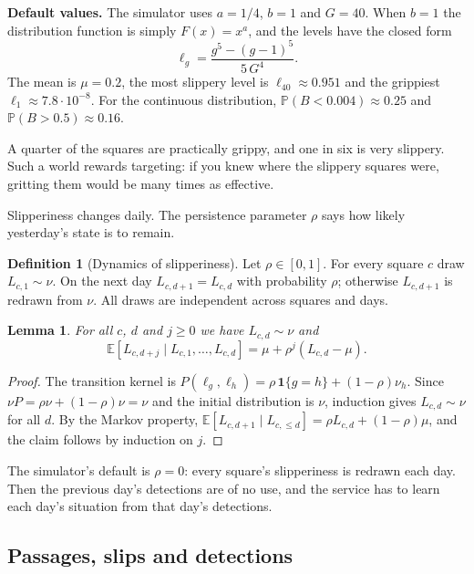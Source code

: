 \documentclass[11pt,a4paper]{article}
\theoremstyle{plain}
\newtheorem{lemma}{Lemma}
\theoremstyle{definition}
\newtheorem{maaritelma}{Definition}
\theoremstyle{remark}
\newcommand{\E}{\mathbb{E}}
\renewcommand{\P}{\mathbb{P}}
\newcommand{\1}{\mathbf{1}}
\begin{document}
\textbf{Default values.} The simulator uses $a = 1/4$, $b = 1$ and $G = 40$.
When $b = 1$ the distribution function is simply $F(x) = x^{a}$, and the levels
have the closed form
\[
  \ell_g = \frac{g^5 - (g-1)^5}{5\, G^4}.
\]
The mean is $\mu = 0.2$, the most slippery level is $\ell_{40} \approx 0.951$ and
the grippiest $\ell_1 \approx 7.8 \cdot 10^{-8}$. For the continuous distribution,
$\P(B < 0.004) \approx 0.25$ and $\P(B > 0.5) \approx 0.16$.

\begin{intuitio}
A quarter of the squares are practically grippy, and one in six is very
slippery. Such a world rewards targeting: if you knew where the slippery squares
were, gritting them would be many times as effective.
\end{intuitio}

Slipperiness changes daily. The persistence parameter $\rho$ says how likely
yesterday's state is to remain.

\begin{maaritelma}[Dynamics of slipperiness]\label{maar:dynamiikka}
Let $\rho \in [0, 1]$. For every square $c$ draw $L_{c,1} \sim \nu$. On the next
day $L_{c,d+1} = L_{c,d}$ with probability $\rho$; otherwise $L_{c,d+1}$ is
redrawn from $\nu$. All draws are independent across squares and days.
\end{maaritelma}

\begin{lemma}\label{le:markov}
For all $c$, $d$ and $j \ge 0$ we have $L_{c,d} \sim \nu$ and
\[
  \E[L_{c,d+j} \mid L_{c,1}, \dots, L_{c,d}] = \mu + \rho^j (L_{c,d} - \mu).
\]
\end{lemma}

\begin{proof}
The transition kernel is $P(\ell_g, \ell_h) = \rho\, \1\{g = h\} + (1-\rho)\nu_h$.
Since $\nu P = \rho \nu + (1-\rho)\nu = \nu$ and the initial distribution is
$\nu$, induction gives $L_{c,d} \sim \nu$ for all $d$. By the Markov property,
$\E[L_{c,d+1} \mid L_{c,\le d}] = \rho L_{c,d} + (1-\rho)\mu$, and the claim
follows by induction on $j$.
\end{proof}

The simulator's default is $\rho = 0$: every square's slipperiness is redrawn
each day. Then the previous day's detections are of no use, and the service has
to learn each day's situation from that day's detections.

\subsection{Passages, slips and detections}
\end{document}
